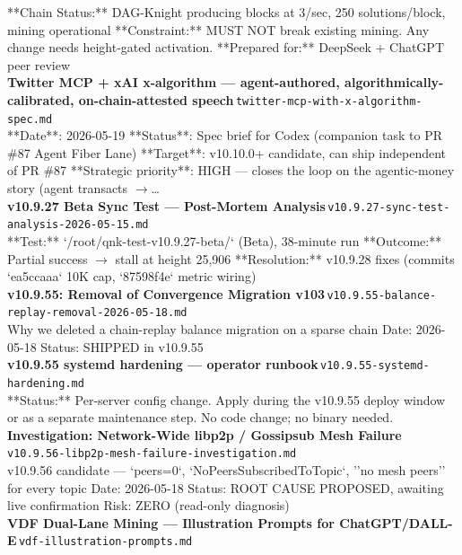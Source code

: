 \documentclass[11pt,a4paper]{article}
\begin{document}
**Chain Status:** DAG-Knight producing blocks at 3/sec, 250 solutions/block, mining operational **Constraint:** MUST NOT break existing mining. Any change needs height-gated activation. **Prepared for:** DeepSeek + ChatGPT peer review\\[6pt]
\noindent\textbf{Twitter MCP + xAI x-algorithm --- agent-authored, algorithmically-calibrated, on-chain-attested speech}\,\textcolor{qgray}{\small \texttt{twitter-mcp-with-x-algorithm-spec.md}}\\
**Date**: 2026-05-19 **Status**: Spec brief for Codex (companion task to PR \#87 Agent Fiber Lane) **Target**: v10.10.0+ candidate, can ship independent of PR \#87 **Strategic priority**: HIGH --- closes the loop on the agentic-money story (agent transacts $\rightarrow$\ldots{}\\[6pt]
\noindent\textbf{v10.9.27 Beta Sync Test --- Post-Mortem Analysis}\,\textcolor{qgray}{\small \texttt{v10.9.27-sync-test-analysis-2026-05-15.md}}\\
**Test:** `/root/qnk-test-v10.9.27-beta/` (Beta), 38-minute run **Outcome:** Partial success $\rightarrow$ stall at height 25,906 **Resolution:** v10.9.28 fixes (commits `ea5ccaaa` 10K cap, `87598f4e` metric wiring)\\[6pt]
\noindent\textbf{v10.9.55: Removal of Convergence Migration v103}\,\textcolor{qgray}{\small \texttt{v10.9.55-balance-replay-removal-2026-05-18.md}}\\
Why we deleted a chain-replay balance migration on a sparse chain Date: 2026-05-18 \textbar{} Status: SHIPPED in v10.9.55\\[6pt]
\noindent\textbf{v10.9.55 systemd hardening --- operator runbook}\,\textcolor{qgray}{\small \texttt{v10.9.55-systemd-hardening.md}}\\
**Status:** Per-server config change. Apply during the v10.9.55 deploy window or as a separate maintenance step. No code change; no binary needed.\\[6pt]
\noindent\textbf{Investigation: Network-Wide libp2p / Gossipsub Mesh Failure}\,\textcolor{qgray}{\small \texttt{v10.9.56-libp2p-mesh-failure-investigation.md}}\\
v10.9.56 candidate --- `peers=0`, `NoPeersSubscribedToTopic`, ''no mesh peers'' for every topic Date: 2026-05-18 \textbar{} Status: ROOT CAUSE PROPOSED, awaiting live confirmation \textbar{} Risk: ZERO (read-only diagnosis)\\[6pt]
\noindent\textbf{VDF Dual-Lane Mining --- Illustration Prompts for ChatGPT/DALL-E}\,\textcolor{qgray}{\small \texttt{vdf-illustration-prompts.md}}\\
\end{document}
